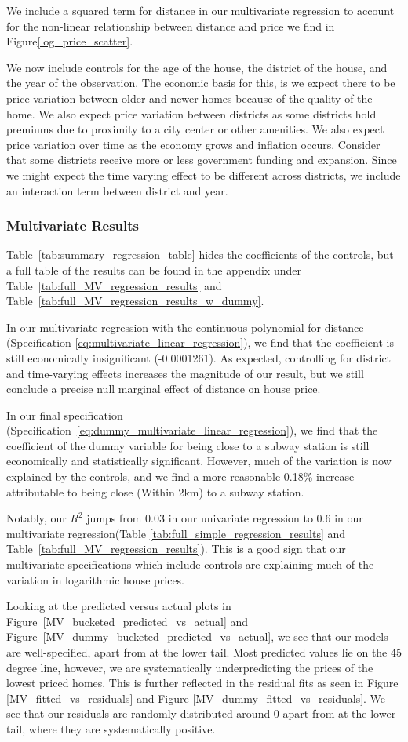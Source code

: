 We include a squared term for distance in our multivariate regression to account for the non-linear relationship between distance and price we find in Figure\ref{log_price_scatter}.

We now include controls for the age of the house, the district of the house, and the year of the observation. The economic basis for this, is we expect there to be 
price variation between older and newer homes because of the quality of the home. We also expect price variation between districts as some districts
hold premiums due to proximity to a city center or other amenities. We also expect price variation over time as the economy grows and inflation occurs.
Consider that some districts receive more or less government funding and expansion. Since we might expect the time varying effect to be different across districts, we include an interaction term between district and year.

\subsubsection{Multivariate Results}
Table~\ref{tab:summary_regression_table} hides the coefficients of the controls, but a full table of the results can be found in the appendix under Table~\ref{tab:full_MV_regression_results} and Table~\ref{tab:full_MV_regression_results_w_dummy}.

In our multivariate regression with the continuous polynomial for distance (Specification \ref{eq:multivariate_linear_regression}), we find that the coefficient is still economically insignificant (-0.0001261). As expected, controlling for district and time-varying effects increases the magnitude of our result, 
but we still conclude a precise null marginal effect of distance on house price.

In our final specification (Specification~\ref{eq:dummy_multivariate_linear_regression}),
 we find that the coefficient of the dummy variable for being close to a subway station is still economically and statistically significant. 
 However, much of the variation is now explained by the controls, and we find a more reasonable 0.18\% increase attributable to being close (Within 2km) to a subway station.

Notably, our $R^2$ jumps from 0.03 in our univariate regression to 0.6 in our multivariate regression(Table \ref{tab:full_simple_regression_results} and Table~\ref{tab:full_MV_regression_results}).
This is a good sign that our multivariate specifications which include controls are explaining much of the variation in logarithmic house prices.

Looking at the predicted versus actual plots in Figure~\ref{MV_bucketed_predicted_vs_actual} and Figure~\ref{MV_dummy_bucketed_predicted_vs_actual}, we see that our models are well-specified, apart from at the lower tail.
Most predicted values lie on the 45 degree line, however, we are systematically underpredicting the prices of the lowest priced homes. This is further reflected in the residual fits
as seen in Figure \ref{MV_fitted_vs_residuals} and Figure \ref{MV_dummy_fitted_vs_residuals}. We see that our residuals are randomly distributed around 0 apart from at the lower tail, where they are systematically positive.